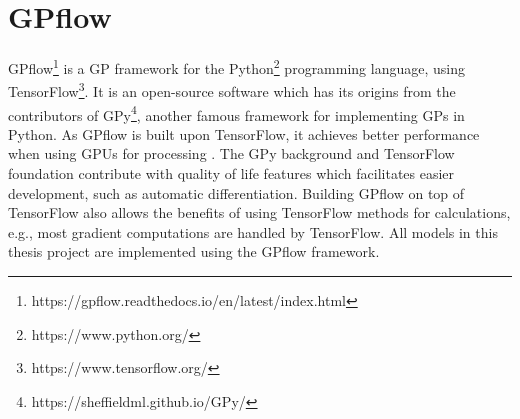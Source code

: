 \section{GPflow}
GPflow\footnote{https://gpflow.readthedocs.io/en/latest/index.html} \cite{GPflow2017} is a GP framework for the Python\footnote{https://www.python.org/} programming language, using TensorFlow\footnote{https://www.tensorflow.org/}.
It is an open-source software which has its origins from the contributors of GPy\footnote{https://sheffieldml.github.io/GPy/}, another famous framework for implementing GPs in Python.
As GPflow is built upon TensorFlow, it achieves better performance when using GPUs for processing \cite{GPflow2017}.
The GPy background and TensorFlow foundation contribute with quality of life features which facilitates easier development, such as automatic differentiation. 
Building GPflow on top of TensorFlow also allows the benefits of using TensorFlow methods for calculations, e.g., most gradient computations are handled by TensorFlow.
All models in this thesis project are implemented using the GPflow framework.



